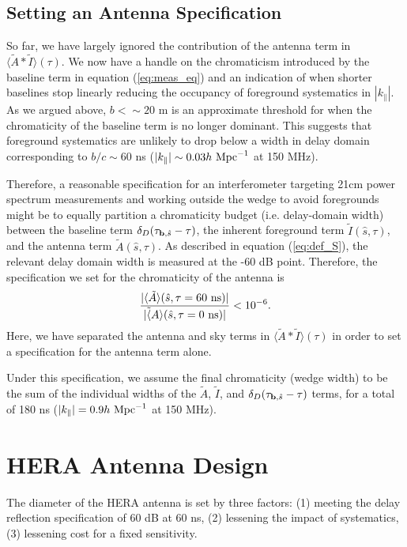 \documentclass[11pt]{article}
\newcommand{\bvec}{{\bf b}}
\newcommand{\shat}{{\hat s}}
\newcommand{\kpl}{{k_\parallel}}
\newcommand{\AI}{{\langle\tilde A*\tilde I\rangle}}
\newcommand{\AItau}{{\AI(\tau)}}
\newcommand{\hMpci}{{h~{\rm Mpc}^{-1}}}
\newcommand{\lsim}{{<\sim}} %
\begin{document}
\subsection{Setting an Antenna Specification}

So far, we have largely ignored the contribution of the antenna term in $\AItau$.  We now have
a handle on the chromaticism introduced by the baseline term in equation (\ref{eq:meas_eq}) and 
an indication of when shorter baselines stop linearly reducing the occupancy of
foreground systematics in $|\kpl|$.  As we argued above, $b\lsim20$ m is an approximate threshold
for when the chromaticity of the baseline term is no longer dominant.  This suggests that
foreground systematics are unlikely to drop below a width in delay domain corresponding to 
$b/c\sim60$ ns ($|\kpl|\sim0.03\hMpci$ at 150 MHz).

Therefore, a reasonable specification 
for an interferometer targeting 21cm power spectrum measurements and working outside
the wedge to avoid foregrounds might be to equally partition a chromaticity budget (i.e. delay-domain
width) between the baseline term $\delta_D(\tau_{\bvec,\shat}-\tau)$, 
the inherent foreground term $\tilde I(\shat,\tau)$, and the antenna term $\tilde A(\shat,\tau)$.
As described in equation (\ref{eq:def_S}), the relevant delay domain width 
is measured at the -60 dB point.  Therefore, the specification we set for the chromaticity
of the antenna is
\begin{equation}
\frac{|\langle\tilde A\rangle(\shat,\tau=60~{\rm ns})|}{|\tilde \langle A\rangle(\shat,\tau=0~{\rm ns})|}<10^{-6}.
\end{equation}
Here, we have separated the antenna and sky terms in $\AItau$ in order to set a specification for
the antenna term alone.

Under this specification, we assume the final chromaticity (wedge width) to be the sum of the
individual widths of the $\tilde A$, $\tilde I$, and $\delta_D(\tau_{\bvec,\shat}-\tau)$ terms,
for a total of 180 ns ($|\kpl|=0.9\hMpci$ at 150 MHz).


\section{HERA Antenna Design}

The diameter of the HERA antenna is set by three factors:  
(1) meeting the delay reflection specification of 60 dB at 60 ns, (2) lessening the impact of systematics, (3) lessening cost for a fixed sensitivity.
\end{document}
